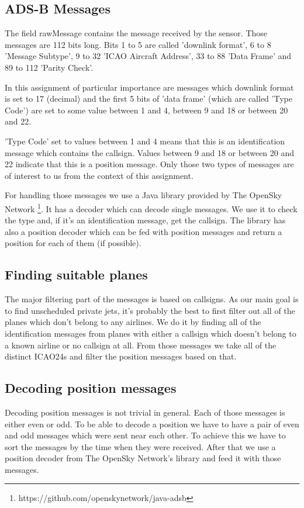 \documentclass{vldb}
\begin{document}
\subsection{ADS-B Messages}
The field rawMessage contains the message received by the sensor. 
Those messages are 112 bits long. Bits 1 to 5 are called 'downlink format', 
6 to 8 'Message Subtype', 9 to 32 'ICAO Aircraft Address', 33 to 88 'Data Frame' and 89 to 112 'Parity Check'. 

In this assignment of particular importance are messages which downlink format is set to 17 (decimal) and 
the first 5 bits of 'data frame' (which are called 'Type Code') are set to some value between 1 and 4, between 9 and 18 or between 20 and 22.

'Type Code' set to values between 1 and 4 means that this is an 
identification message which contains the callsign. 
Values between 9 and 18 or between 20 and 22 indicate that this is a position message. 
Only those two types of messages are of interest to us from the context of this assignment.

For handling those messages we use a Java library provided 
by The OpenSky Network \footnote{https://github.com/openskynetwork/java-adsb}. 
It has a decoder which can decode single messages. We use it to check the type and, 
if it’s an identification message, get the callsign. 
The library has also a position decoder which can be fed 
with position messages and return a position for each of them (if possible).

\subsection{Finding suitable planes}
The major filtering part of the messages is based on callsigns. 
As our main goal is to find unscheduled private jets, it’s probably 
the best to first filter out all of the planes which don’t belong to any airlines. 
We do it by finding all of the identification messages from planes 
with either a callsign which doesn’t belong to a known airline or no callsign at all. 
From those messages we take all of the distinct ICAO24s and filter the position messages based on that.

\subsection{Decoding position messages}
Decoding position messages is not trivial in general. Each of those messages is either even or odd. 
To be able to decode a position we have to have a pair of even and odd messages which were sent near each other. 
To achieve this we have to sort the messages by the time when they were received. 
After that we use a position decoder from The OpenSky Network’s library and feed it with those messages.
\end{document}
